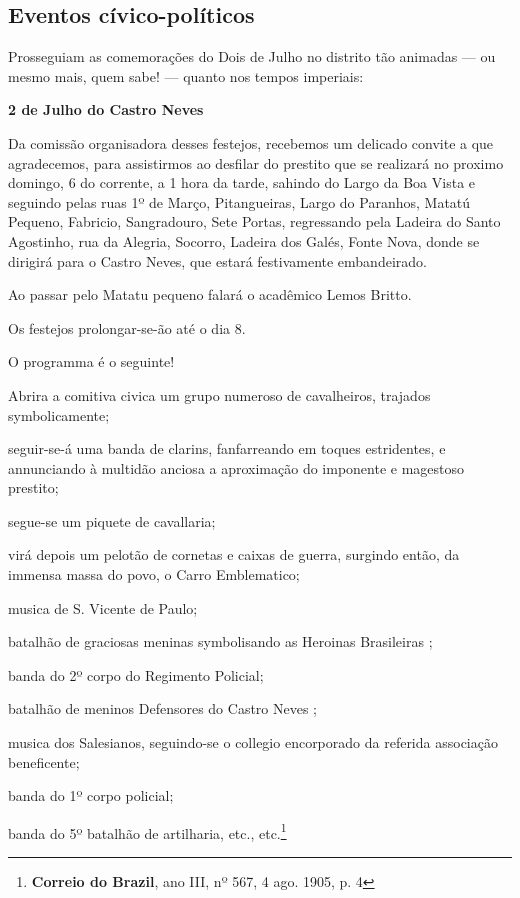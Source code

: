 \subsection{Eventos cívico-políticos}

Prosseguiam as comemorações do Dois de Julho no distrito tão animadas --- ou mesmo mais, quem sabe! --- quanto nos tempos imperiais:

\begin{citacao}
\textbf{2 de Julho do Castro Neves}

Da comissão organisadora desses festejos, recebemos um delicado convite a que agradecemos, para assistirmos ao desfilar do prestito que se realizará no proximo domingo, 6 do corrente, a 1 hora da tarde, sahindo do Largo da Boa Vista e seguindo pelas ruas 1º de Março, Pitangueiras, Largo do Paranhos, Matatú Pequeno, Fabricio, Sangradouro, Sete Portas, regressando pela Ladeira do Santo Agostinho, rua da Alegria, Socorro, Ladeira dos Galés, Fonte Nova, donde se dirigirá para o Castro Neves, que estará festivamente embandeirado.

Ao passar pelo Matatu pequeno falará o acadêmico Lemos Britto.

Os festejos prolongar-se-ão até o dia 8.

O programma é o seguinte!

Abrira a comitiva civica um grupo numeroso de cavalheiros, trajados symbolicamente;

seguir-se-á uma banda de clarins, fanfarreando em toques estridentes, e annunciando à multidão anciosa a aproximação do imponente e magestoso prestito;

segue-se um piquete de cavallaria;

virá depois um pelotão de cornetas e caixas de guerra, surgindo então, da immensa massa do povo, o Carro Emblematico;

musica de S. Vicente de Paulo;

batalhão de graciosas meninas symbolisando as \og Heroinas Brasileiras \fg{};

banda do 2º corpo do Regimento Policial;

batalhão de meninos \og Defensores do Castro Neves \fg{};

musica dos Salesianos, seguindo-se o collegio encorporado da referida associação beneficente;

banda do 1º corpo policial;

banda do 5º batalhão de artilharia, etc., etc.\footnote{\textbf{Correio do Brazil}, ano III, nº 567, 4 ago. 1905, p. 4}
\end{citacao}

